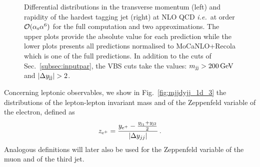 \begin{figure}[hbt]
\caption{Differential distributions in the transverse momentum (left) and rapidity of the hardest tagging jet (right) at NLO QCD \emph{i.e.}\ at order $\mathcal{O}(\alpha_\text{s}\alpha^6)$ for the full computation and two approximations.
The upper plots provide the absolute value for each prediction while the lower plots presents all predictions normalised to {\sc MoCaNLO}+{\sc Recola} which is one of the full predictions.
In addition to the cuts of Sec.~\ref{subsec:inputpar}, the VBS cuts take the values: $m_{\text{j}\text{j}}>200 \,\text{GeV}$ and $|\Delta y_{\Pj\Pj}|>2$.} 
\label{fig:mjjdyjj_1d_2}
\end{figure}

Concerning leptonic observables, we show in Fig.~\ref{fig:mjjdyjj_1d_3} the distributions of the lepton-lepton invariant mass and of the Zeppenfeld variable of the electron, defined as
%
\begin{equation}
  z_{\text{e}^+} = \frac{y_{\text{e}^+}-\frac{y_{\text{j}_1}+y_{\text{j}2}}2}{|\Delta y_{jj}|} \,.
  \label{eq:Zeppenfeld}
\end{equation}
%
Analogous definitions will later also be used for the Zeppenfeld variable of the muon and of the third jet.
%
